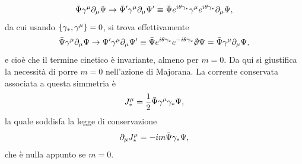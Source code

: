 \begin{equation}
    \bar{\Psi}\gamma^\mu\partial_\mu\Psi \to \bar{\Psi}'\gamma^\mu\partial_\mu\Psi' \equiv \bar{\Psi}e^{i\theta\gamma_*}\gamma^\mu e^{i\theta\gamma_*}\partial_\mu\Psi,
\end{equation}
da cui usando $\{\gamma_*,\gamma^\mu\} = 0$, si trova effettivamente
\begin{equation}
    \b{\Psi}\gamma^\mu\p_\mu\Psi \to \Psi'\gamma^\mu\p_\mu\Psi' \equiv \b{\Psi}e^{i\theta\gamma_*}e^{-i\theta\gamma_*}\sl{\p}\Psi = \b{\Psi}\gamma^\mu\p_\mu\Psi,
\end{equation}
e cioè che il termine cinetico è invariante, almeno per $m = 0$. Da qui si giustifica la necessità di porre $m = 0$ nell'azione di Majorana. La corrente conservata associata a questa simmetria è
\begin{equation}
    J^\mu_* = \frac{1}{2}\bar{\Psi}\gamma^\mu\gamma_*\Psi,
\end{equation}
la quale soddisfa la legge di conservazione
\begin{equation}
    \partial_\mu J^\mu_* = -im\bar{\Psi}\gamma_*\Psi,
\end{equation}
che è nulla appunto se $m = 0$.
